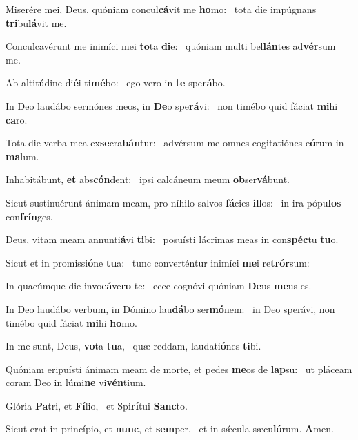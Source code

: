 \item Miserére mei, Deus, quóniam concul\textbf{cá}vit me \textbf{ho}mo:~\psstar{} tota die impúgnans \textbf{tri}bu\textbf{lá}vit me.
\item Conculcavérunt me inimíci mei \textbf{to}ta \textbf{di}e:~\psstar{} quóniam multi bel\textbf{lán}tes ad\textbf{vér}sum me.
\item Ab altitúdine di\textbf{é}i ti\textbf{mé}bo:~\psstar{} ego vero in \textbf{te} spe\textbf{rá}bo.
\item In Deo laudábo sermónes meos, in \textbf{De}o spe\textbf{rá}vi:~\psstar{} non timébo quid fáciat \textbf{mi}hi \textbf{ca}ro.
\item Tota die verba mea ex\textbf{se}cra\textbf{bán}tur:~\psstar{} advérsum me omnes cogitatiónes e\textbf{ó}rum in \textbf{ma}lum.
\item Inhabitábunt, \textbf{et} abs\textbf{cón}\-dent:~\psstar{} ipsi calcáneum meum \textbf{ob}ser\textbf{vá}bunt.
\item Sicut sustinuérunt ánimam meam, pro níhilo salvos \textbf{fá}cies \textbf{il}los:~\psstar{} in ira pópu\textbf{los} con\textbf{frín}ges.
\item Deus, vitam meam annunti\textbf{á}vi \textbf{ti}bi:~\psstar{} posuísti lácrimas meas in con\textbf{spéc}tu \textbf{tu}o.
\item Sicut et in promissi\textbf{ó}ne \textbf{tu}a:~\psstar{} tunc converténtur inimíci \textbf{me}i re\textbf{trór}sum:
\item In quacúmque die invo\textbf{cá}ve\textbf{ro} te:~\psstar{} ecce cognóvi quóniam \textbf{De}us \textbf{me}us es.
\item In Deo laudábo verbum, in Dómino lau\textbf{dá}bo ser\textbf{mó}nem:~\psstar{} in Deo sperávi, non timébo quid fáciat \textbf{mi}hi \textbf{ho}mo.
\item In me sunt, Deus, \textbf{vo}ta \textbf{tu}a,~\psstar{} quæ reddam, laudati\textbf{ó}nes \textbf{ti}bi.
\item Quóniam eripuísti ánimam meam de morte, et pedes \textbf{me}os de \textbf{lap}su:~\psstar{} ut pláceam coram Deo in lúmi\textbf{ne} vi\textbf{vén}tium.
\item Glória \textbf{Pa}tri, et \textbf{Fí}lio,~\psstar{} et Spi\textbf{rí}tui \textbf{Sanc}to.
\item Sicut erat in princípio, et \textbf{nunc}, et \textbf{sem}per,~\psstar{} et in sǽcula sæcu\textbf{ló}rum. \textbf{A}men.
